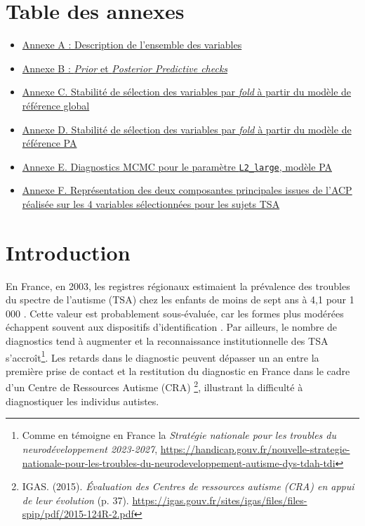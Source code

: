 \documentclass[11pt]{report}
\begin{document}
\newpage

\begingroup
\let\clearpage\relax
\listoffigures
\listoftables
\endgroup

\chapter*{Table des annexes}
\begin{itemize}[label={},leftmargin=1.5em]
	\item \hyperref[table:annexe_description_var]{Annexe A : Description de l'ensemble des variables}
	\item \hyperref[fig:ppc]{Annexe B : \textit{Prior} et \textit{Posterior Predictive checks}}
	\item \hyperref[fig:stab_ref]{Annexe C. Stabilité de sélection des variables par \textit{fold} à partir du modèle de référence global}
	\item \hyperref[fig:stab_PA]{Annexe D. Stabilité de sélection des variables par \textit{fold} à partir du modèle de référence PA}
	\item \hyperref[fig:diag_mcmc_ex_PA]{Annexe E. Diagnostics MCMC pour le paramètre \texttt{L2\_large}, modèle PA}
	\item \hyperref[fig:acp]{Annexe F. Représentation des deux composantes principales issues de l'ACP réalisée sur les 4 variables sélectionnées pour les sujets TSA}
\end{itemize}




\chapter{Introduction}

\pagestyle{plain}
\setcounter{page}{1}
En France, en 2003, les registres régionaux estimaient la prévalence des troubles du spectre de l'autisme (TSA) chez les enfants de moins de sept ans à 4,1 pour 1 000 \parencite[p.10]{HAS2018_TSA}. Cette valeur est probablement sous-évaluée, car les formes plus modérées échappent souvent aux dispositifs d'identification \parencite[p.10]{HAS2018_TSA}. Par ailleurs, le nombre de diagnostics tend à augmenter \parencite{zeidan_global_2022} et la reconnaissance institutionnelle des TSA s'accroît\footnote{Comme en témoigne en France la \textit{Stratégie nationale pour les troubles du neurodéveloppement 2023-2027}, \url{https://handicap.gouv.fr/nouvelle-strategie-nationale-pour-les-troubles-du-neurodeveloppement-autisme-dys-tdah-tdi}}. Les retards dans le diagnostic peuvent dépasser un an entre la première prise de contact et la restitution du diagnostic en France dans le cadre d'un Centre de Ressources Autisme (CRA) \footnote{IGAS. (2015). \textit{Évaluation des Centres de ressources autisme (CRA) en appui de leur évolution} (p. 37). \url{https://igas.gouv.fr/sites/igas/files/files-spip/pdf/2015-124R-2.pdf}}, illustrant la difficulté à diagnostiquer les individus autistes.
\end{document}
